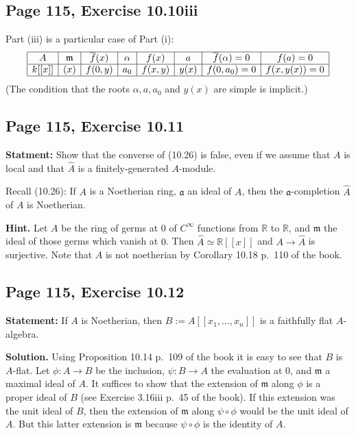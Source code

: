 \documentclass[parskip=half,fontsize=12pt]{scrartcl}%
\newcommand{\mf}{\mathfrak}
\newcommand{\aaa}{\mf a}
\newcommand{\mmm}{\mf m}
\newcommand{\nnn}{\mf n}
\begin{document}
\subsection{Page 115, Exercise 10.10iii}%

Part (iii) is a particular case of Part (i):
$$
\begin{array}{|c|c|c|c|c|c|c|c|}\hline
A&\mmm&\overline f(x)&\alpha&f(x)&a&\overline f(\alpha)=0&f(a)=0\\ \hline
k[[x]]&(x)&f(0,y)&a_0&f(x,y)&y(x)&f(0,a_0)=0&f(x,y(x))=0\\ \hline
\end{array}
$$ 
(The condition that the roots $\alpha,a,a_0$ and $y(x)$ are simple is implicit.)%

\subsection{Page 115, Exercise 10.11}%

\textbf{Statment:} Show that the converse of (10.26) is false, even if we assume that $A$ is local and that $\widehat A$ is a finitely-generated $A$-module.

Recall (10.26): If $A$ is a Noetherian ring, $\aaa$ an ideal of $A$, then the $\aaa$-completion $\widehat A$ of $A$ is Noetherian.

\textbf{Hint.} Let $A$ be the ring of germs at $0$ of $C^\infty$ functions from $\mathbb R$ to $\mathbb R$, and $\mmm$ the ideal of those germs which vanish at $0$. Then $\widehat A\simeq\mathbb R[[x]]$ and $A\to\widehat A$ is surjective. Note that $A$ is not noetherian by Corollary 10.18 p.~110 of the book. 

\subsection{Page 115, Exercise 10.12}%

\textbf{Statement:} If $A$ is Noetherian, then $B:=A[[x_1,\ldots,x_n]]$ is a faithfully flat $A$-algebra. 

\textbf{Solution.} Using Proposition 10.14 p.~109 of the book it is easy to see that $B$ is $A$-flat. Let $\phi:A\to B$ be the inclusion, $\psi:B\to A$ the evaluation at $0$, and $\mmm$ a maximal ideal of $A$. It suffices to show that the extension of $\mmm$ along $\phi$ is a proper ideal of $B$ (see Exercise 3.16iii p.~45 of the book). If this extension was the unit ideal of $B$, then the extension of $\mmm$ along $\psi\circ\phi$ would be the unit ideal of $A$. But this latter extension is $\mmm$ because $\psi\circ\phi$ is the identity of $A$.%
\end{document}
